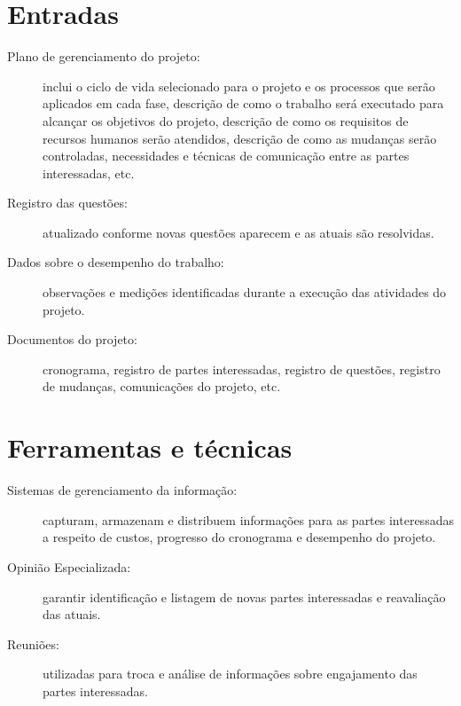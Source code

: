 \section{Entradas}

\begin{description}	

	\item[Plano de gerenciamento do projeto:] inclui o ciclo de vida selecionado para o projeto e os processos que serão aplicados em cada fase, descrição de como o trabalho será executado para alcançar os objetivos do projeto, descrição de como os requisitos de recursos humanos serão atendidos, descrição de como as mudanças serão controladas, necessidades e técnicas de comunicação entre as partes interessadas, etc.
	
	\item[Registro das questões:] atualizado conforme novas questões aparecem e as atuais são resolvidas.
	
	\item[Dados sobre o desempenho do trabalho:] observações e medições identificadas durante a execução das atividades do projeto.
	
	\item[Documentos do projeto:] cronograma, registro de partes interessadas, registro de questões, registro de mudanças, comunicações do projeto, etc.
	
\end{description}

\section{Ferramentas e técnicas}

\begin{description}

	\item[Sistemas de gerenciamento da informação:] capturam, armazenam e distribuem informações para as partes interessadas a respeito de custos, progresso do cronograma e desempenho do projeto.
	
	\item[Opinião Especializada:] garantir identificação e listagem de novas partes interessadas e reavaliação das atuais.
	
	\item[Reuniões:] utilizadas para troca e análise de informações sobre engajamento das partes interessadas.
			
\end{description}


